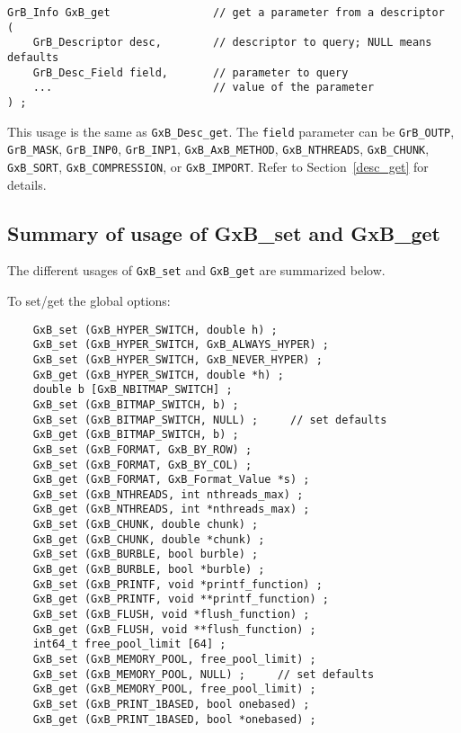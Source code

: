 \documentclass[12pt]{article}
\begin{document}
\begin{mdframed}[userdefinedwidth=6in]
{\footnotesize
\begin{verbatim}
GrB_Info GxB_get                // get a parameter from a descriptor
(
    GrB_Descriptor desc,        // descriptor to query; NULL means defaults
    GrB_Desc_Field field,       // parameter to query
    ...                         // value of the parameter
) ;
\end{verbatim} } \end{mdframed}

This usage is the same as \verb'GxB_Desc_get'.  The \verb'field' parameter can
be \verb'GrB_OUTP', \verb'GrB_MASK', \verb'GrB_INP0', \verb'GrB_INP1',
\verb'GxB_AxB_METHOD',
\verb'GxB_NTHREADS',
\verb'GxB_CHUNK',
\verb'GxB_SORT',
\verb'GxB_COMPRESSION', or
\verb'GxB_IMPORT'.
Refer to Section~\ref{desc_get} for details.

\subsection{Summary of usage of {\sf GxB\_set} and {\sf GxB\_get}}

The different usages of \verb'GxB_set' and \verb'GxB_get' are summarized below.

\noindent
To set/get the global options:

    {\footnotesize
    \begin{verbatim}
    GxB_set (GxB_HYPER_SWITCH, double h) ;
    GxB_set (GxB_HYPER_SWITCH, GxB_ALWAYS_HYPER) ;
    GxB_set (GxB_HYPER_SWITCH, GxB_NEVER_HYPER) ;
    GxB_get (GxB_HYPER_SWITCH, double *h) ;
    double b [GxB_NBITMAP_SWITCH] ;
    GxB_set (GxB_BITMAP_SWITCH, b) ;
    GxB_set (GxB_BITMAP_SWITCH, NULL) ;     // set defaults
    GxB_get (GxB_BITMAP_SWITCH, b) ;
    GxB_set (GxB_FORMAT, GxB_BY_ROW) ;
    GxB_set (GxB_FORMAT, GxB_BY_COL) ;
    GxB_get (GxB_FORMAT, GxB_Format_Value *s) ;
    GxB_set (GxB_NTHREADS, int nthreads_max) ;
    GxB_get (GxB_NTHREADS, int *nthreads_max) ;
    GxB_set (GxB_CHUNK, double chunk) ;
    GxB_get (GxB_CHUNK, double *chunk) ;
    GxB_set (GxB_BURBLE, bool burble) ;
    GxB_get (GxB_BURBLE, bool *burble) ;
    GxB_set (GxB_PRINTF, void *printf_function) ;
    GxB_get (GxB_PRINTF, void **printf_function) ;
    GxB_set (GxB_FLUSH, void *flush_function) ;
    GxB_get (GxB_FLUSH, void **flush_function) ;
    int64_t free_pool_limit [64] ;
    GxB_set (GxB_MEMORY_POOL, free_pool_limit) ;
    GxB_set (GxB_MEMORY_POOL, NULL) ;     // set defaults
    GxB_get (GxB_MEMORY_POOL, free_pool_limit) ;
    GxB_set (GxB_PRINT_1BASED, bool onebased) ;
    GxB_get (GxB_PRINT_1BASED, bool *onebased) ; \end{verbatim} }
\end{document}

